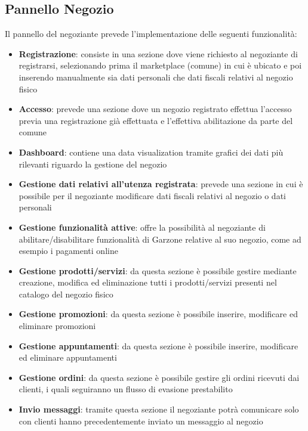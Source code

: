 \subsection{Pannello Negozio}
Il pannello del negoziante prevede l'implementazione delle seguenti funzionalità:
\begin{itemize}
    \item \textbf{Registrazione}: consiste in una sezione dove viene richiesto al negoziante di registrarsi, selezionando prima il marketplace (comune) in cui è ubicato e poi inserendo manualmente sia dati personali che dati fiscali relativi al negozio fisico
    \item \textbf{Accesso}: prevede una sezione dove un negozio registrato effettua l'accesso previa una registrazione già effettuata e l'effettiva abilitazione da parte del comune
    \item \textbf{Dashboard}: contiene una data visualization tramite grafici dei dati più rilevanti riguardo la gestione del negozio
    \item \textbf{Gestione dati relativi all'utenza registrata}: prevede una sezione in cui è possibile per il negoziante modificare dati fiscali relativi al negozio o dati personali
    \item \textbf{Gestione funzionalità attive}: offre la possibilità al negoziante di abilitare/disabilitare funzionalità di Garzone relative al suo negozio, come ad esempio i pagamenti online
    \item \textbf{Gestione prodotti/servizi}: da questa sezione è possibile gestire mediante creazione, modifica ed eliminazione tutti i prodotti/servizi presenti nel catalogo del negozio fisico
    \item \textbf{Gestione promozioni}: da questa sezione è possibile inserire, modificare ed eliminare promozioni
    \item \textbf{Gestione appuntamenti}: da questa sezione è possibile inserire, modificare ed eliminare appuntamenti
    \item \textbf{Gestione ordini}: da questa sezione è possibile gestire gli ordini ricevuti dai clienti, i quali seguiranno un flusso di evasione prestabilito
    \item \textbf{Invio messaggi}: tramite questa sezione il negoziante potrà comunicare solo con clienti hanno precedentemente inviato un messaggio al negozio
\end{itemize}
